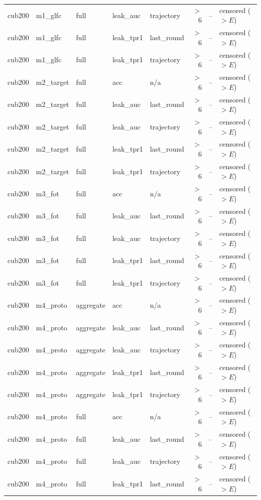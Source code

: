 \begin{tabular}{lllllrrl}
cub200 & m1\_glfc & full & leak\_auc & trajectory & $>$6 & -- & censored ($>E$) \\
cub200 & m1\_glfc & full & leak\_tpr1 & last\_round & $>$6 & -- & censored ($>E$) \\
cub200 & m1\_glfc & full & leak\_tpr1 & trajectory & $>$6 & -- & censored ($>E$) \\
cub200 & m2\_target & full & acc & n/a & $>$6 & -- & censored ($>E$) \\
cub200 & m2\_target & full & leak\_auc & last\_round & $>$6 & -- & censored ($>E$) \\
cub200 & m2\_target & full & leak\_auc & trajectory & $>$6 & -- & censored ($>E$) \\
cub200 & m2\_target & full & leak\_tpr1 & last\_round & $>$6 & -- & censored ($>E$) \\
cub200 & m2\_target & full & leak\_tpr1 & trajectory & $>$6 & -- & censored ($>E$) \\
cub200 & m3\_fot & full & acc & n/a & $>$6 & -- & censored ($>E$) \\
cub200 & m3\_fot & full & leak\_auc & last\_round & $>$6 & -- & censored ($>E$) \\
cub200 & m3\_fot & full & leak\_auc & trajectory & $>$6 & -- & censored ($>E$) \\
cub200 & m3\_fot & full & leak\_tpr1 & last\_round & $>$6 & -- & censored ($>E$) \\
cub200 & m3\_fot & full & leak\_tpr1 & trajectory & $>$6 & -- & censored ($>E$) \\
cub200 & m4\_proto & aggregate & acc & n/a & $>$6 & -- & censored ($>E$) \\
cub200 & m4\_proto & aggregate & leak\_auc & last\_round & $>$6 & -- & censored ($>E$) \\
cub200 & m4\_proto & aggregate & leak\_auc & trajectory & $>$6 & -- & censored ($>E$) \\
cub200 & m4\_proto & aggregate & leak\_tpr1 & last\_round & $>$6 & -- & censored ($>E$) \\
cub200 & m4\_proto & aggregate & leak\_tpr1 & trajectory & $>$6 & -- & censored ($>E$) \\
cub200 & m4\_proto & full & acc & n/a & $>$6 & -- & censored ($>E$) \\
cub200 & m4\_proto & full & leak\_auc & last\_round & $>$6 & -- & censored ($>E$) \\
cub200 & m4\_proto & full & leak\_auc & trajectory & $>$6 & -- & censored ($>E$) \\
cub200 & m4\_proto & full & leak\_tpr1 & last\_round & $>$6 & -- & censored ($>E$) \\

\end{tabular}
